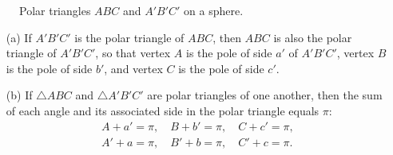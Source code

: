 \begin{tcolorbox}[title={Polar Triangles}]
\begin{question}
\begin{figure}[H]
        \caption{Polar triangles $ABC$ and $A'B'C'$ on a sphere.}
        \label{fig:polartriangles}
    \end{figure}
\begin{enumerate}
    \item[(a)] If $A'B'C'$ is the polar triangle of $ABC$, then $ABC$ is also the polar triangle of $A'B'C'$, so that vertex $A$ is the pole of side $a'$ of $A'B'C'$, vertex $B$ is the pole of side $b'$, and vertex $C$ is the pole of side $c'$. 
    \item[(b)] If $\triangle ABC$ and $\triangle A'B'C'$ are polar triangles of one another, then the sum of each angle and its associated side in the polar triangle equals $\pi$:
    \begin{align*}
        A+a' = \pi, \quad B+b'=\pi, \quad C+c'=\pi,\\
        A'+a=\pi, \quad B'+b=\pi, \quad C'+c=\pi.
    \end{align*}
\end{enumerate}
\end{question}    
\end{tcolorbox}

